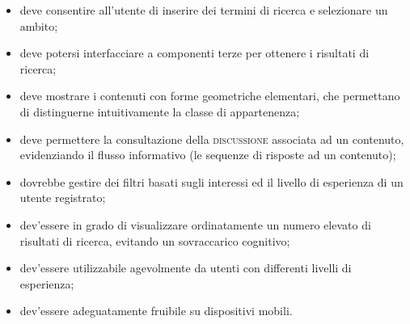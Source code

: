 \begin{itemize}
	\item deve consentire all'utente di inserire dei termini di ricerca e selezionare un ambito;
	\item deve potersi interfacciare a componenti terze per ottenere i risultati di ricerca;
	\item deve mostrare i contenuti con forme geometriche elementari, che permettano di distinguerne intuitivamente la classe di appartenenza;
	\item deve permettere la consultazione della \textsc{discussione} associata ad un contenuto, evidenziando il flusso informativo (le sequenze di risposte ad un contenuto);
	\item dovrebbe gestire dei filtri basati sugli interessi ed il livello di esperienza di un utente registrato;
	\item dev'essere in grado di visualizzare ordinatamente un numero elevato di risultati di ricerca, evitando un sovraccarico cognitivo;
	\item dev'essere utilizzabile agevolmente da utenti con differenti livelli di esperienza;
	\item dev'essere adeguatamente fruibile su dispositivi mobili.
\end{itemize}
